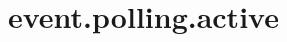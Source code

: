 \section{event.polling.active}
\label{configuration:EventPollingActive}
\AvailableInJavaAndCsharp{\TODO}
